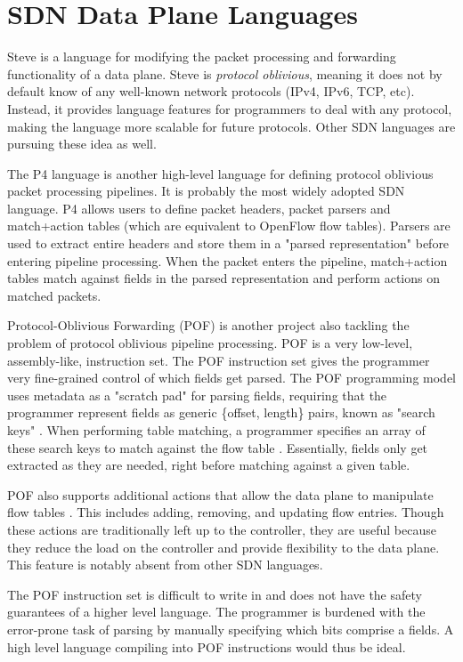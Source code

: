 \section{SDN Data Plane Languages} \label{rel:p4}

Steve is a language for modifying the packet processing and forwarding functionality of a data plane. Steve is \textit{protocol oblivious}, meaning it does not by default
know of any well-known network protocols (IPv4, IPv6, TCP, etc). Instead, it
provides language features for programmers to deal with any protocol, making the
language more scalable for future protocols. Other SDN languages are pursuing
these idea as well.

The P4 language \cite{p4_spec, p4_spec2} is another high-level language for
defining protocol oblivious packet processing pipelines. It is probably the
most widely adopted SDN language. P4 allows users to define packet headers,
packet parsers and
match+action tables (which are equivalent to OpenFlow flow tables). Parsers are
used to extract entire headers and store them in a "parsed representation"
before entering pipeline processing. When the packet enters the pipeline,
match+action tables match against fields in the parsed representation and
perform actions on matched packets.

Protocol-Oblivious Forwarding (POF) \cite{pof_fis, pof, pof_impl} is another
project also tackling the problem of protocol oblivious pipeline processing. POF
is a very low-level, assembly-like, instruction set. The POF instruction
set gives the programmer very fine-grained control of which fields get parsed.
The POF programming model uses metadata as a "scratch pad" for parsing fields,
requiring that the
programmer represent fields as generic \{offset, length\} pairs, known as
"search keys" \cite{pof}. When performing table matching, a programmer specifies
an array of these search keys to match against the flow table \cite{pof_impl}.
Essentially, fields only get extracted as they are needed, right before matching
against a given table.

POF also supports additional actions that allow the data plane to manipulate
flow tables \cite{pof}. This includes adding, removing, and updating flow
entries. Though these actions are traditionally left up to the controller, they
are useful because they reduce the load on the controller and provide
flexibility to the data plane. This feature is notably absent from other SDN
languages.

The POF instruction set is difficult to write in and does not have the safety
guarantees of a higher level language. The programmer is burdened with the
error-prone task of parsing by manually specifying which bits comprise a fields.
A high level language compiling into POF instructions would thus be ideal.

